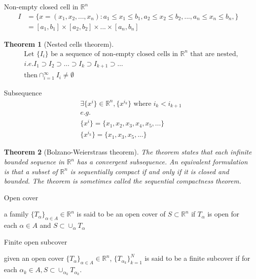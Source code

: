 \documentclass{article}
\newtheorem{theorem}{Theorem}
\begin{document}
Non-empty closed cell in $\mathbb{R}^{n}$
\begin{align}
I&=\{x=(x_{1},x_{2},...,x_{n}):a_{1}\leqslant x_{1} \leqslant b_{1}, a_{2}\leqslant x_{2} \leqslant b_{2},...,a_{n}\leqslant x_{n} \leqslant b_{n},   \}
\\&=[a_{1},b_{1}]\times[a_{2},b_{2}]\times ... \times [a_{n},b_{n}]
\end{align}

\begin{theorem}[Nested cells theorem]
\begin{align}
&\text{Let } \{I_{i}\} \text{ be a sequence of non-empty closed cells in } \mathbb{R}^{n} \text{ that are nested,}
\\&i.e. I_{1} \supset I_{2} \supset \dots \supset I_{k}\supset I_{k+1} \supset \dots
\\&\text{then} \mathop{\cap}_{i=1}^{\infty}I_{i}\neq \emptyset
\end{align}
\end{theorem}

Subsequence
\begin{align}
&\exists \{x^{i}\}\in \mathbb{R}^{n},\{x^{i_{k}}\}\text{ where } i_{k}<i_{k+1}
\\&e.g.
\\&\{x^{i}\}=\{x_{1},x_{2},x_{3},x_{4},x_{5},...\}
\\&\{x^{i_{k}}\}=\{x_{1},x_{3},x_{5},...\}
\end{align}

\begin{theorem}[Bolzano-Weierstrass theorem]
The theorem states that each infinite bounded sequence in $\mathbb{R}^{n}$ has a convergent subsequence. An equivalent formulation is that a subset of $\mathbb {R} ^{n}$ is sequentially compact if and only if it is closed and bounded. The theorem is sometimes called the sequential compactness theorem.
\end{theorem}



Open cover

a family $\{T_{\alpha}\}_{\alpha\in A} \in \mathbb{R}^{n}$ is said to be an open cover of $S \subset \mathbb{R}^{n}$ if $T_{\alpha}$ is open for each $\alpha \in A$ and $S\subset \mathop{\cup}_{\alpha}T_{\alpha}$

Finite open subcover

given an open cover $\{T_{\alpha}\}_{\alpha\in A} \in \mathbb{R}^{n}$, $\{T_{\alpha_{k}}\}_{k=1}^{N}$ is said to be a finite subcover if for each $\alpha_{k}\in A, S\subset \cup_{\alpha_{k}}T_{\alpha_{k}}$. 
\end{document}
